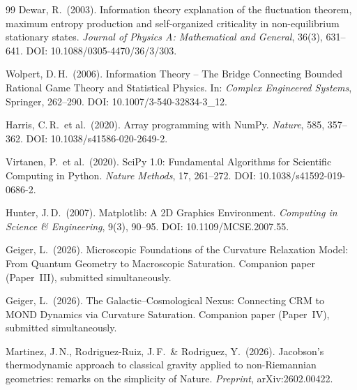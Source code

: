 \documentclass[aps,prd,twocolumn,superscriptaddress,nofootinbib]{revtex4-2}
\begin{document}
\begin{thebibliography}{99}
Dewar, R.\ (2003).
Information theory explanation of the fluctuation theorem, maximum entropy production and self-organized criticality in non-equilibrium stationary states.
\textit{Journal of Physics A: Mathematical and General}, 36(3), 631--641.
DOI: 10.1088/0305-4470/36/3/303.

Wolpert, D.\,H.\ (2006).
Information Theory -- The Bridge Connecting Bounded Rational Game Theory and Statistical Physics.
In: \textit{Complex Engineered Systems}, Springer, 262--290.
DOI: 10.1007/3-540-32834-3\_12.

Harris, C.\,R.\ et al.\ (2020).
Array programming with NumPy.
\textit{Nature}, 585, 357--362.
DOI: 10.1038/s41586-020-2649-2.

Virtanen, P.\ et al.\ (2020).
SciPy 1.0: Fundamental Algorithms for Scientific Computing in Python.
\textit{Nature Methods}, 17, 261--272.
DOI: 10.1038/s41592-019-0686-2.

Hunter, J.\,D.\ (2007).
Matplotlib: A 2D Graphics Environment.
\textit{Computing in Science \& Engineering}, 9(3), 90--95.
DOI: 10.1109/MCSE.2007.55.

Geiger, L.\ (2026).
Microscopic Foundations of the Curvature Relaxation Model: From Quantum Geometry to Macroscopic Saturation.
Companion paper (Paper~III), submitted simultaneously.

Geiger, L.\ (2026).
The Galactic--Cosmological Nexus: Connecting CRM to MOND Dynamics via Curvature Saturation.
Companion paper (Paper~IV), submitted simultaneously.

Martinez, J.\,N., Rodriguez-Ruiz, J.\,F.\ \& Rodriguez, Y.\ (2026).
Jacobson's thermodynamic approach to classical gravity applied to non-Riemannian geometries: remarks on the simplicity of Nature.
\textit{Preprint}, arXiv:2602.00422.

\end{thebibliography}
\end{document}
